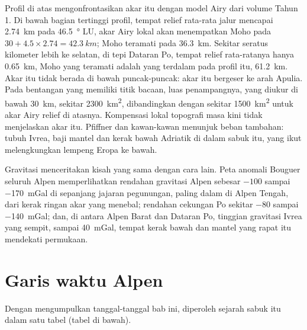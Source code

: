 Profil di atas mengonfrontasikan akar itu dengan model Airy dari volume
Tahun 1. Di bawah bagian tertinggi profil, tempat relief rata-rata jalur mencapai
\qty{2.74}{km} pada \qty{46.5}{\degree} LU, akar Airy lokal akan menempatkan Moho pada
$30 + 4.5 \times 2.74 = \qty{42.3}{km}$; Moho teramati pada \qty{36.3}{km}. Sekitar seratus
kilometer lebih ke selatan, di tepi Dataran Po, tempat relief rata-ratanya hanya
\qty{0.65}{km}, Moho yang teramati adalah yang terdalam pada profil itu, \qty{61.2}{km}. Akar itu tidak berada di bawah puncak-puncak: akar itu
bergeser ke arah Apulia. Pada bentangan yang memiliki titik bacaan, luas penampangnya, yang diukur
di bawah \qty{30}{km}, sekitar \qty{2300}{km^2}, dibandingkan dengan sekitar \qty{1500}{km^2} untuk akar
Airy relief di atasnya. Kompensasi lokal topografi masa kini tidak
menjelaskan akar itu. Pfiffner dan kawan-kawan menunjuk beban tambahan: tubuh Ivrea, baji
mantel dan kerak bawah Adriatik di dalam sabuk itu, yang ikut melengkungkan lempeng Eropa
ke bawah.

Gravitasi menceritakan kisah yang sama dengan cara lain. Peta anomali Bouguer seluruh Alpen memperlihatkan
rendahan gravitasi Alpen sebesar $-100$ sampai \qty{-170}{mGal} di sepanjang jajaran pegunungan, paling dalam di Alpen
Tengah, dari kerak ringan akar yang menebal; rendahan cekungan Po sekitar $-80$ sampai
\qty{-140}{mGal}; dan, di antara Alpen Barat dan Dataran Po, tinggian gravitasi Ivrea
yang sempit, sampai \qty{+40}{mGal}, tempat kerak bawah dan mantel yang rapat itu mendekati
permukaan.

\section{Garis waktu Alpen}\label{sec:b2:alpine-orogen:timeline}

Dengan mengumpulkan tanggal-tanggal bab ini, diperoleh sejarah sabuk itu dalam satu tabel
(tabel di bawah).


